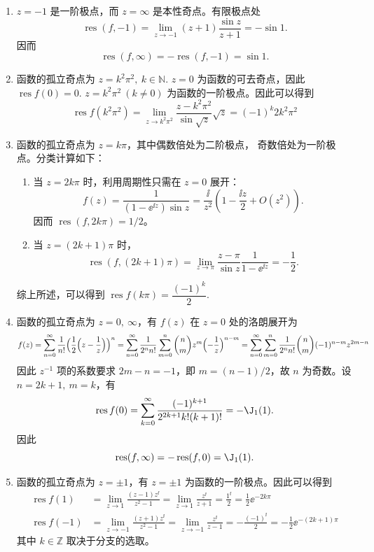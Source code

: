 \begin{question}
\begin{solution}
\begin{enumerate}
  \item \(z=-1\) 是一阶极点，而 \(z=\infty\) 是本性奇点。有限极点处
  \[
  \operatorname{res}(f,-1)
  =\lim_{z\to-1}(z+1)\frac{\sin z}{z+1}
  =-\sin1.
  \]
  因而
  \[
  \operatorname{res}(f,\infty)
  =-\operatorname{res}(f,-1)=\sin1.
  \]

  \item 函数的孤立奇点为 \(z=k^2\pi^2,\ k\in\mathbb{N}\). \(z=0\) 为函数的可去奇点，因此 \(\operatorname{res}f(0)=0\). \(z=k^2\pi^2\ (k\neq0)\) 为函数的一阶极点。因此可以得到
\[
\operatorname{res}f(k^2\pi^2)=\lim_{z\to k^2\pi^2}\frac{z-k^2\pi^2}{\sin\sqrt{z}}\sqrt{z}=(-1)^k2k^2\pi^2
\]


  \item 函数的孤立奇点为 \(z=k\pi\)，其中偶数倍处为二阶极点，
  奇数倍处为一阶极点。分类计算如下：
  \begin{enumerate}
    \item 当 \(z=2k\pi\) 时，利用周期性只需在 \(z=0\) 展开：
    \[
    f(z)=\frac1{(1-\ee^{\ii z})\sin z}
    =\frac{\ii}{z^2}\left(1-\frac{\ii z}{2}+O(z^2)\right).
    \]
    因而 \(\operatorname{res}(f,2k\pi)=1/2\)。

    \item 当 \(z=(2k+1)\pi\) 时，
    \[
    \operatorname{res}(f,(2k+1)\pi)
    =\lim_{z\to\pi}\frac{z-\pi}{\sin z}\frac1{1-\ee^{\ii z}}
    =-\frac12.
    \]
  \end{enumerate}

综上所述，可以得到 \(\operatorname{res}f(k\pi)=\dfrac{(-1)^k}{2}\).

  \item 函数的孤立奇点为 \(z=0,\ \infty\)，有 \(f(z)\) 在 \(z=0\) 处的洛朗展开为
\[
f(z)=\sum_{n=0}^\infty\frac1{n!}\Bigl(\frac12\Bigl(z-\frac1z\Bigr)\Bigr)^n=\sum_{n=0}^\infty\frac1{2^n n!}\sum_{m=0}^n\binom{n}{m}z^m\Bigl(-\frac1z\Bigr)^{n-m}=\sum_{n=0}^\infty\sum_{m=0}^n\frac{1}{2^n n!}\binom{n}{m}(-1)^{n-m}z^{2m-n}
\]
因此 \(z^{-1}\) 项的系数要求 \(2m-n=-1\)，即 \(m=(n-1)/2\)，故 \(n\) 为奇数。设 \(n=2k+1,\ m=k\)，有
\[
\operatorname{res}f(0)
=\sum_{k=0}^\infty
\frac{(-1)^{k+1}}{2^{2k+1}k!(k+1)!}
=-\J_1(1).
\]
因此
\[
\operatorname{res}(f,\infty)
=-\operatorname{res}(f,0)
=\J_1(1).
\]

  \item 函数的孤立奇点为 \(z=\pm1\)，有 \(z=\pm1\) 为函数的一阶极点。因此可以得到
\[
\begin{aligned}
\operatorname{res}f(1)&=\lim_{z\to1}\frac{(z-1)z^{\ii}}{z^2-1}=\lim_{z\to1}\frac{z^{\ii}}{z+1}=\frac{1^{\ii}}{2}=\frac12\ee^{-2k\pi}\\
\operatorname{res}f(-1)&=\lim_{z\to-1}\frac{(z+1)z^{\ii}}{z^2-1}=\lim_{z\to-1}\frac{z^{\ii}}{z-1}=-\frac{(-1)^{\ii}}{2}=-\frac12\ee^{-(2k+1)\pi}
\end{aligned}
\]
其中 \(k\in\mathbb{Z}\) 取决于分支的选取。


\end{enumerate}
\end{solution}
\end{question}
